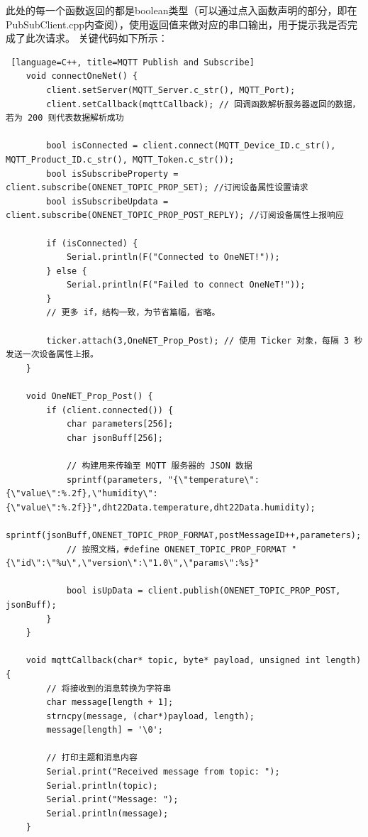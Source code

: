 此处的每一个函数返回的都是boolean类型（可以通过点入函数声明的部分，即在PubSubClient.cpp内查阅），使用返回值来做对应的串口输出，用于提示我是否完成了此次请求。
关键代码如下所示：

\begin{lstlisting} [language=C++, title=MQTT Publish and Subscribe] 
    void connectOneNet() {
        client.setServer(MQTT_Server.c_str(), MQTT_Port);
        client.setCallback(mqttCallback); // 回调函数解析服务器返回的数据，若为 200 则代表数据解析成功

        bool isConnected = client.connect(MQTT_Device_ID.c_str(), MQTT_Product_ID.c_str(), MQTT_Token.c_str());
        bool isSubscribeProperty = client.subscribe(ONENET_TOPIC_PROP_SET); //订阅设备属性设置请求
        bool isSubscribeUpdata = client.subscribe(ONENET_TOPIC_PROP_POST_REPLY); //订阅设备属性上报响应

        if (isConnected) {
            Serial.println(F("Connected to OneNET!"));
        } else {
            Serial.println(F("Failed to connect OneNeT!"));
        }
        // 更多 if，结构一致，为节省篇幅，省略。

        ticker.attach(3,OneNET_Prop_Post); // 使用 Ticker 对象，每隔 3 秒发送一次设备属性上报。
    }
    
    void OneNET_Prop_Post() {
        if (client.connected()) {
            char parameters[256];
            char jsonBuff[256];

            // 构建用来传输至 MQTT 服务器的 JSON 数据
            sprintf(parameters, "{\"temperature\":{\"value\":%.2f},\"humidity\":{\"value\":%.2f}}",dht22Data.temperature,dht22Data.humidity);
            sprintf(jsonBuff,ONENET_TOPIC_PROP_FORMAT,postMessageID++,parameters);
            // 按照文档，#define ONENET_TOPIC_PROP_FORMAT "{\"id\":\"%u\",\"version\":\"1.0\",\"params\":%s}"

            bool isUpData = client.publish(ONENET_TOPIC_PROP_POST, jsonBuff);
        }
    }
    
    void mqttCallback(char* topic, byte* payload, unsigned int length) {
        // 将接收到的消息转换为字符串
        char message[length + 1];
        strncpy(message, (char*)payload, length);
        message[length] = '\0';
    
        // 打印主题和消息内容
        Serial.print("Received message from topic: ");
        Serial.println(topic);
        Serial.print("Message: ");
        Serial.println(message);
    }
\end{lstlisting}


